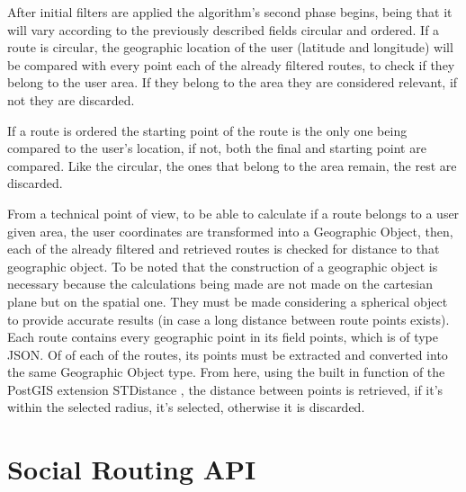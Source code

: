     After initial filters are applied the algorithm's second phase begins, being that it will vary according to the previously described fields
    circular and ordered. 
    If a route is circular, the geographic location of the user (latitude and longitude) will be compared with every point each of the already filtered routes,
    to check if they belong to the user area. If they belong to the area they are considered relevant, if not they are discarded.

    If a route is ordered the starting point of the route is the only one being compared to the user's location, if not, both the final and starting point are
    compared. Like the circular, the ones that belong to the area remain, the rest are discarded.

    From a technical point of view, to be able to calculate if a route belongs to a user given area, the user coordinates are transformed into a Geographic Object\cite{geographicobject},
    then, each of the already filtered and retrieved routes is checked for distance to that geographic object. To be noted that the construction of a geographic
    object is necessary because the calculations being made are not made on the cartesian plane but on the spatial one. They must be made considering a spherical 
    object to provide accurate results (in case a long distance between route points exists). Each route contains every geographic point in its field points,
    which is of type JSON. Of of each of the routes, its points must be extracted and converted into the same Geographic Object type. From here, using the built in function
    of the PostGIS extension STDistance \cite{stdistance}, the distance between points is retrieved, if it's within the selected radius, it's selected, otherwise it is discarded.
    
    \newpage
\section{Social Routing API} \label{apisection}   
